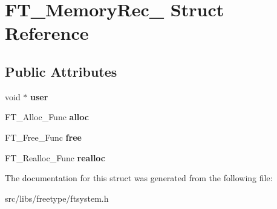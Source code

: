 \hypertarget{struct_f_t___memory_rec__}{
\section{FT\_\-MemoryRec\_\- Struct Reference}
\label{struct_f_t___memory_rec__}
}
\subsection*{Public Attributes}
\begin{DoxyCompactItemize}
\item 
\hypertarget{struct_f_t___memory_rec___aae5bc614434ba4525e37d7faaf03c4b7}{
void $\ast$ {\bfseries user}}
\label{struct_f_t___memory_rec___aae5bc614434ba4525e37d7faaf03c4b7}

\item 
\hypertarget{struct_f_t___memory_rec___a2269eada6afbb008fe5c73707145410c}{
FT\_\-Alloc\_\-Func {\bfseries alloc}}
\label{struct_f_t___memory_rec___a2269eada6afbb008fe5c73707145410c}

\item 
\hypertarget{struct_f_t___memory_rec___a83ab2422bd9265d8731b9e5e368ba240}{
FT\_\-Free\_\-Func {\bfseries free}}
\label{struct_f_t___memory_rec___a83ab2422bd9265d8731b9e5e368ba240}

\item 
\hypertarget{struct_f_t___memory_rec___a5ce3424cc72e898fe973ffeabe44a95c}{
FT\_\-Realloc\_\-Func {\bfseries realloc}}
\label{struct_f_t___memory_rec___a5ce3424cc72e898fe973ffeabe44a95c}

\end{DoxyCompactItemize}


The documentation for this struct was generated from the following file:\begin{DoxyCompactItemize}
\item 
src/libs/freetype/ftsystem.h\end{DoxyCompactItemize}
